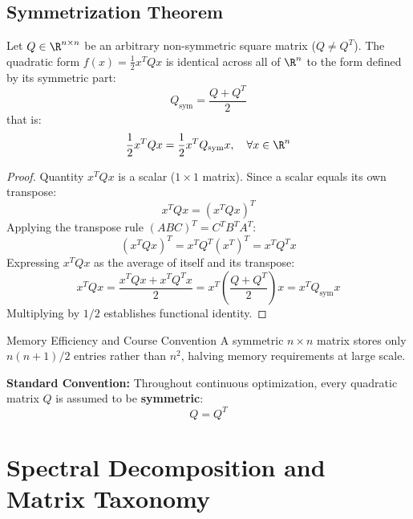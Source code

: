 \subsection{Symmetrization Theorem}
\begin{theorem}
Let $Q \in \R^{n \times n}$ be an arbitrary non-symmetric square matrix ($Q \neq Q^T$). The quadratic form $f(x) = \frac{1}{2} x^T Q x$ is identical across all of $\R^n$ to the form defined by its symmetric part:
\begin{equation}
Q_{\text{sym}} = \frac{Q + Q^T}{2}
\end{equation}
that is:
\begin{equation}
\frac{1}{2} x^T Q x = \frac{1}{2} x^T Q_{\text{sym}} x, \quad \forall x \in \R^n
\end{equation}
\end{theorem}

\begin{proof}
Quantity $x^T Q x$ is a scalar ($1 \times 1$ matrix). Since a scalar equals its own transpose:
\begin{equation}
x^T Q x = (x^T Q x)^T
\end{equation}
Applying the transpose rule $(A B C)^T = C^T B^T A^T$:
\begin{equation}
(x^T Q x)^T = x^T Q^T (x^T)^T = x^T Q^T x
\end{equation}
Expressing $x^T Q x$ as the average of itself and its transpose:
\begin{equation}
x^T Q x = \frac{x^T Q x + x^T Q^T x}{2} = x^T \left( \frac{Q + Q^T}{2} \right) x = x^T Q_{\text{sym}} x
\end{equation}
Multiplying by $1/2$ establishes functional identity.
\end{proof}

\begin{noteblock}{Memory Efficiency and Course Convention}
A symmetric $n \times n$ matrix stores only $n(n+1)/2$ entries rather than $n^2$, halving memory requirements at large scale.

\textbf{Standard Convention:} Throughout continuous optimization, every quadratic matrix $Q$ is assumed to be \textbf{symmetric}:
\begin{equation}
Q = Q^T
\end{equation}
\end{noteblock}


\FloatBarrier
\section{Spectral Decomposition and Matrix Taxonomy}
\label{sec:opt-spectral-decomposition-taxonomy-en}

